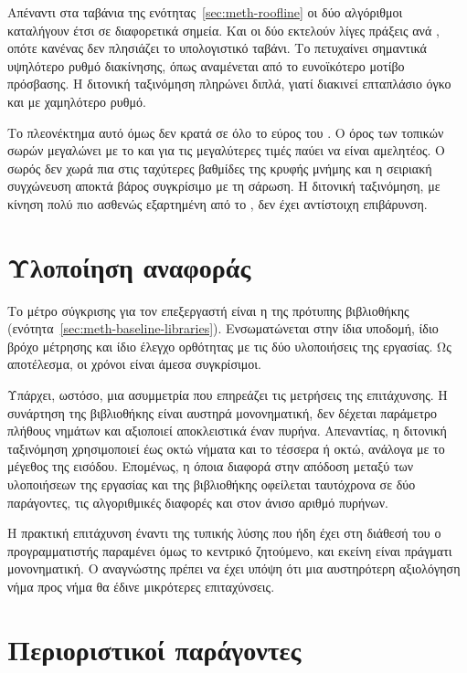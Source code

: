 Απέναντι στα ταβάνια της ενότητας~\ref{sec:meth-roofline} οι δύο αλγόριθμοι
καταλήγουν έτσι σε διαφορετικά σημεία. Και οι δύο εκτελούν λίγες πράξεις ανά
, οπότε κανένας δεν πλησιάζει το υπολογιστικό ταβάνι. Το
 πετυχαίνει σημαντικά υψηλότερο ρυθμό διακίνησης, όπως
αναμένεται από το ευνοϊκότερο μοτίβο πρόσβασης. Η διτονική ταξινόμηση πληρώνει
διπλά, γιατί διακινεί επταπλάσιο όγκο και με χαμηλότερο ρυθμό.

Το πλεονέκτημα αυτό όμως δεν κρατά σε όλο το εύρος του . Ο όρος των
τοπικών σωρών μεγαλώνει με το  και για τις μεγαλύτερες τιμές παύει να
είναι αμελητέος. Ο σωρός δεν χωρά πια στις ταχύτερες βαθμίδες της κρυφής μνήμης
και η σειριακή συγχώνευση αποκτά βάρος συγκρίσιμο με τη σάρωση. Η διτονική
ταξινόμηση, με κίνηση πολύ πιο ασθενώς εξαρτημένη από το , δεν έχει
αντίστοιχη επιβάρυνση.

\section{Υλοποίηση αναφοράς}
\label{sec:cpu-reference}

Το μέτρο σύγκρισης για τον επεξεργαστή είναι η  της
πρότυπης βιβλιοθήκης (ενότητα~\ref{sec:meth-baseline-libraries}). Ενσωματώνεται
στην ίδια υποδομή, ίδιο βρόχο μέτρησης και ίδιο έλεγχο ορθότητας με τις δύο
υλοποιήσεις της εργασίας. Ως αποτέλεσμα, οι χρόνοι είναι άμεσα συγκρίσιμοι.

Υπάρχει, ωστόσο, μια ασυμμετρία που επηρεάζει τις μετρήσεις της επιτάχυνσης. Η
συνάρτηση της βιβλιοθήκης είναι αυστηρά μονονηματική, δεν δέχεται παράμετρο
πλήθους νημάτων και αξιοποιεί αποκλειστικά έναν πυρήνα. Απεναντίας, η διτονική
ταξινόμηση χρησιμοποιεί έως οκτώ νήματα και το  τέσσερα ή οκτώ,
ανάλογα με το μέγεθος της εισόδου. Επομένως, η όποια διαφορά στην απόδοση
μεταξύ των υλοποιήσεων της εργασίας και της βιβλιοθήκης οφείλεται ταυτόχρονα σε
δύο παράγοντες, τις αλγοριθμικές διαφορές και στον άνισο αριθμό πυρήνων.

Η πρακτική επιτάχυνση έναντι της τυπικής λύσης που ήδη έχει στη διάθεσή του ο
προγραμματιστής παραμένει όμως το κεντρικό ζητούμενο, και εκείνη είναι πράγματι
μονονηματική. Ο αναγνώστης πρέπει να έχει υπόψη ότι μια αυστηρότερη αξιολόγηση
νήμα προς νήμα θα έδινε μικρότερες επιταχύνσεις.

\section{Περιοριστικοί παράγοντες}
\label{sec:cpu-bottlenecks}

